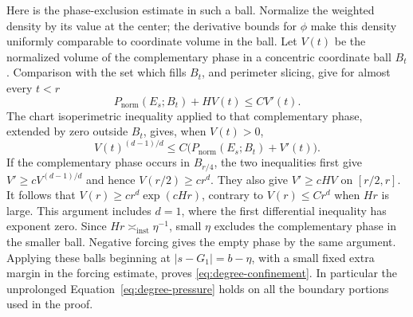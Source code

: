 Here is the phase-exclusion estimate in such a ball.  Normalize the
weighted density by its value at the center; the derivative bounds for
$\phi$ make this density uniformly comparable to coordinate volume in
the ball.  Let $V(t)$ be the normalized volume of the complementary
phase in a concentric coordinate ball $B_t$.  Comparison with the set
which fills $B_t$, and perimeter slicing, give for almost every $t<r$
\[
 P_{\mathrm{norm}}(E_s;B_t)+H V(t)\le C V'(t).
\]
The chart isoperimetric inequality applied to that complementary phase,
extended by zero outside $B_t$, gives, when $V(t)>0$,
\[
 V(t)^{(d-1)/d}\le C\bigl(P_{\mathrm{norm}}(E_s;B_t)+V'(t)\bigr).
\]
If the complementary phase occurs in $B_{r/4}$, the two inequalities first
give $V'\ge cV^{(d-1)/d}$ and hence $V(r/2)\ge cr^d$.  They also give
$V'\ge cHV$ on $[r/2,r]$.  It follows that
$V(r)\ge cr^d\exp(cHr)$, contrary to $V(r)\le Cr^d$ when $Hr$ is large.
This argument includes $d=1$, where the first differential inequality
has exponent zero.  Since $Hr\asymp_{\mathrm{inst}}\eta^{-1}$, small
$\eta$ excludes the complementary phase in the smaller ball.  Negative
forcing gives the empty phase by the same argument.  Applying these
balls beginning at $|s-G_1|=b-\eta$, with a small fixed extra margin in
the forcing estimate, proves \eqref{eq:degree-confinement}.  In particular
the unprolonged Equation~\eqref{eq:degree-pressure} holds on all the
boundary portions used in the proof.

